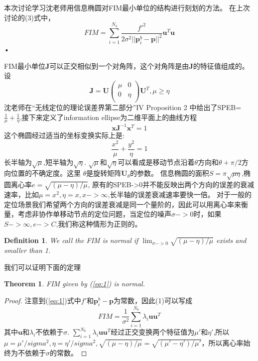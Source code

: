 \documentclass[12pt]{article}
\newtheorem{definition}{Definition}
\newtheorem{thm}{Theorem}[section]
\theoremstyle{remark}
\begin{document}
\title{\textbf{}} 

\author{}
\maketitle
\large
本次讨论学习沈老师用信息椭圆对FIM最小单位的结构进行刻划的方法。
在上次讨论的(3)式中，
\begin{equation}\label{eq:1}
FIM=\displaystyle\sum_{i=1}^{N_b}\frac{f'^2}{2\sigma^2 ||\bm{p}^b_i-\bm{p}||^2}\bm{u}^T\bm{u}
\end{equation}•

FIM最小单位$\bm{J}$可以正交相似到一个对角阵，这个对角阵是由$\bm{J}$的特征值组成的。
设
\[
\bm{J}=\bm{U}\left(\begin{array}{cc}
\mu & 0 \\
0 & \eta \\
\end{array}
\right) \bm{U}^T,\mu \geq \eta
\]
沈老师在“无线定位的理论误差界第二部分”IV Proposition 2 中给出了SPEB=$\frac{1}{\mu}+\frac{1}{\eta}$,接下来定义了information ellipse为二维平面上的曲线方程
\begin{equation}\label{eq:ie}
\bm{x}\bm{J}^{-1}\bm{x}^T=1
\end{equation}
这个椭圆经过适当的坐标变换实际上是:
\begin{equation}
\frac{x^2}{\mu}+\frac{y^2}{\eta}=1
\end{equation}
长半轴为$\sqrt{\mu}$,短半轴为$\sqrt{\eta}$.
$\sqrt{\mu}$和$\sqrt{\eta}$可以看成是移动节点沿着$\theta$方向和$\theta+\pi/2$方向位置的不确定度。这里
$\theta$是旋转矩阵$\bm{U}_{\theta}$的参数。
信息椭圆的面积$S=\pi\sqrt{\mu\eta}$,椭圆离心率$e=\sqrt{(\mu-\eta)/\mu}$, 原有的SPEB->0并不能反映出两个方向的误差的衰减速率，比如$\mu=x^2,\eta=x,x->\infty$,长半轴的误差衰减速率要快一倍。
对于一般的定位场景我们希望两个方向的误差衰减是同一个量阶的，因此可以用离心率来衡量，考虑非协作单移动节点的定位问题，当定位的噪声$\sigma->0$时，如果$S->\infty,e->C$,我们称这种情形为正则的。
\begin{definition}
We call the FIM is normal if $ 
\displaystyle\lim_{\sigma->0}\sqrt{(\mu-\eta)/\mu}$ exists and smaller than 1.
\end{definition}
我们可以证明下面的定理
\begin{thm}FIM given by (\ref{eq:1}) is normal.\end{thm}
\begin{proof}
注意到(\ref{eq:1})式中$f'$和$\bm{p}^b_i-\bm{p}$为常数，因此(1)可以写成
\begin{equation}
FIM=\frac{1}{\sigma^2}\sum_{i=1}^{N_b}\lambda_i \bm{u}\bm{u}^T
\end{equation}
其中$\bm{u}$和$\lambda_i$不依赖于$\sigma$.
$\sum_{i=1}^{N_b}\lambda_i \bm{u}\bm{u}^T$经过正交变换两个特征值为$\mu'$和$\eta'$,所以$\mu=\mu'/sigma^2,\eta=\eta'/sigma^2,\sqrt{(\mu-\eta)/\mu}=\sqrt{(\mu'-\eta')/\mu'}$，所以离心率始终为不依赖于$\sigma$的常数。
\end{proof}
\end{document}
